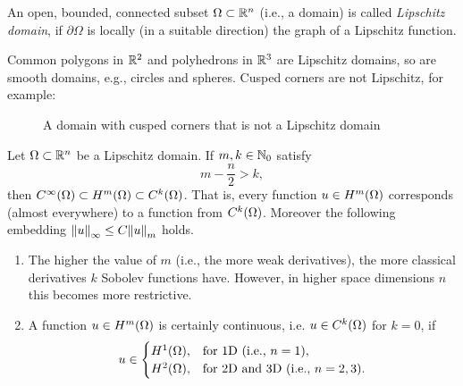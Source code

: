 \begin{definition}
	An open, bounded, connected subset \(\Omega \subset \mathbb{R}^n\) (i.e., a domain) is called \emph{Lipschitz domain}, if \(\partial\Omega\) is locally (in a suitable direction) the graph of a Lipschitz function.
\end{definition}

\begin{example}
	Common polygons in \(\mathbb{R}^2\) and polyhedrons in \(\mathbb{R}^3\) are Lipschitz domains, so are smooth domains, e.g., circles and spheres.
	Cusped corners are not Lipschitz, for example:
	\begin{figure}[h]
		\centering
		\caption{A domain with cusped corners that is not a Lipschitz domain}
		\label{fig:2-1}
	\end{figure}
\end{example}

\begin{theorem}
	Let \(\Omega \subset \mathbb{R}^n\) be a Lipschitz domain.
	If \(m, k \in \mathbb{N}_0\) satisfy
	\[
		m - \frac{n}{2} > k,
	\]
	then \(C^\infty\parentheses*{\Omega} \subset H^m\parentheses*{\Omega} \subset C^k\parentheses*{\Omega}\).
	That is, every function \(u \in H^m\parentheses*{\Omega}\) corresponds (almost everywhere) to a function from \(C^k\parentheses*{\Omega}\).
	Moreover the following embedding \(\norm*{u}_\infty \le C\norm*{u}_m\) holds.
\end{theorem}

\begin{remark}
	\begin{enumerate}
		\item The higher the value of \(m\) (i.e., the more weak derivatives), the more classical derivatives \(k\) Sobolev functions have.
		However, in higher space dimensions \(n\) this becomes more restrictive.
		\item A function \(u \in H^m\parentheses*{\Omega}\) is certainly continuous, i.e. \(u \in C^k\parentheses*{\Omega}\) for \(k = 0\), if
		\[
			u \in \begin{cases}
				H^1\parentheses*{\Omega}, & \text{for 1D (i.e., }n = 1\text{)},\\
				H^2\parentheses*{\Omega}, & \text{for 2D and 3D (i.e., }n = 2, 3\text{)}.
			\end{cases}
		\]
	\end{enumerate}
\end{remark}

